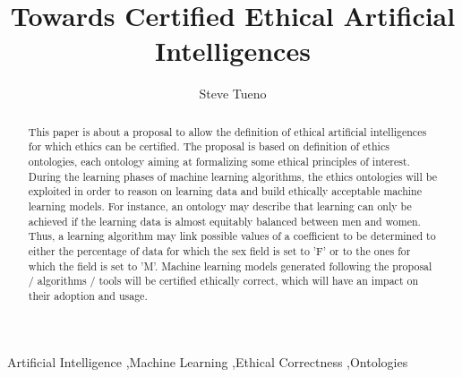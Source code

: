 \documentclass[times]{elsarticle}
\begin{document}
\begin{frontmatter}

\title{Towards Certified Ethical Artificial Intelligences
}



\author{Steve Tueno}
\address{Université de Sherbrooke, Québec, Canada}







\begin{abstract}
This paper is about a proposal to allow the definition of ethical artificial intelligences for which ethics can be certified.
The proposal is based on definition of ethics ontologies, each ontology aiming at formalizing some ethical principles of interest. 
During the learning phases of machine learning algorithms, the  ethics ontologies will be exploited  in order to reason on learning data and build ethically acceptable machine learning models.
For instance, an ontology may describe that learning can only be achieved if the learning data is almost equitably balanced between men and women.
Thus, a learning algorithm may link possible values of a coefficient to be determined to either the percentage of data for which the sex field is set to 'F' or to the ones for which the field is set to 'M'.
Machine learning models generated following the proposal / algorithms / tools will be certified ethically correct, which will have an impact on their adoption and usage.

\end{abstract}

\begin{keyword}
Artificial Intelligence \sep Machine Learning \sep Ethical Correctness \sep  Ontologies
\end{keyword}

\end{frontmatter}
\end{document}
